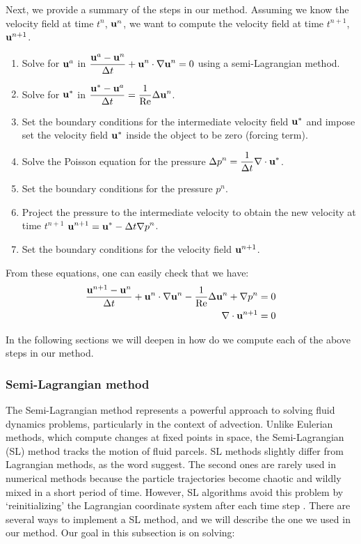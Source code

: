 Next, we provide a summary of the steps in our method. Assuming we know the velocity field at time $t^n$, $\boldsymbol{\mathrm{u}}^n$, we want to compute the velocity field at time $t^{n+1}$, $\boldsymbol{\mathrm{u}}^{n+1}$.
\begin{enumerate}
  \item Solve for $\boldsymbol{\mathrm{u}}^a$ in $\displaystyle  \frac{\boldsymbol{\mathrm{u}}^a-\boldsymbol{\mathrm{u}}^n}{\Delta t} + \boldsymbol{\mathrm{u}}^n \cdot \nabla \boldsymbol{\mathrm{u}}^n = 0$ using a semi-Lagrangian method.
  \item Solve for $\boldsymbol{\mathrm{u}}^*$ in $\displaystyle  \frac{\boldsymbol{\mathrm{u}}^* - \boldsymbol{\mathrm{u}}^a}{\Delta t} = \frac{1}{\mathrm{Re}} \Delta \boldsymbol{\mathrm{u}}^n$.
  \item Set the boundary conditions for the intermediate velocity field $\boldsymbol{\mathrm{u}}^*$ and impose set the velocity field $\boldsymbol{\mathrm{u}}^*$ inside the object to be zero (forcing term).
  \item Solve the Poisson equation for the pressure $\displaystyle \Delta p^{n} = \frac{1}{\Delta t}\nabla \cdot \boldsymbol{\mathrm{u}}^*$.
  \item Set the boundary conditions for the pressure $p^{n}$.
  \item Project the pressure to the intermediate velocity to obtain the new velocity at time $t^{n+1}$ $\displaystyle \boldsymbol{\mathrm{u}}^{n+1} = \boldsymbol{\mathrm{u}}^* - \Delta t\nabla p^{n}$.
  \item Set the boundary conditions for the velocity field $\boldsymbol{\mathrm{u}}^{n+1}$.
\end{enumerate}
From these equations, one can easily check that we have:
\begin{align*}
  \frac{\boldsymbol{\mathrm{u}}^{n+1}-\boldsymbol{\mathrm{u}}^n}{\Delta t} + \boldsymbol{\mathrm{u}}^n \cdot \nabla \boldsymbol{\mathrm{u}}^n - \frac{1}{\mathrm{Re}} \Delta \boldsymbol{\mathrm{u}}^n + \nabla p^{n} & = 0 \\
  \nabla \cdot \boldsymbol{\mathrm{u}}^{n+1}                                                                                                   & = 0
\end{align*}

In the following sections we will deepen in how do we compute each of the above steps in our method.

\subsubsection*{Semi-Lagrangian method}
The Semi-Lagrangian method represents a powerful approach to solving fluid dynamics problems, particularly in the context of advection. Unlike Eulerian methods, which compute changes at fixed points in space, the Semi-Lagrangian (SL) method tracks the motion of fluid parcels. SL methods slightly differ from Lagrangian methods, as the word suggest. The second ones are rarely used in numerical methods because the particle trajectories become chaotic and wildly mixed in a short period of time. However, SL algorithms avoid this problem by `reinitializing' the Lagrangian coordinate system after each time step \cite{Boyd2001ChebyshevFourier}. There are several ways to implement a SL method, and we will describe the one we used in our method. Our goal in this subsection is on solving:

